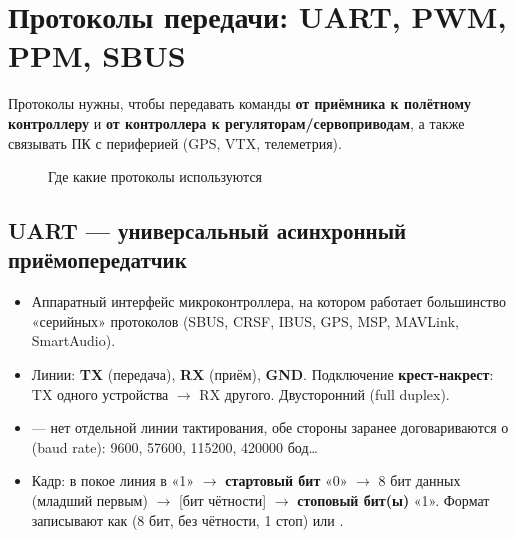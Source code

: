 \section{Протоколы передачи: UART, PWM, PPM, SBUS}

Протоколы нужны, чтобы передавать команды \textbf{от приёмника к полётному контроллеру} и \textbf{от контроллера к регуляторам/сервоприводам}, а также связывать ПК с периферией (GPS, VTX, телеметрия).

\begin{figure}[H]\centering
{}
\caption{Где какие протоколы используются}
\end{figure}

\subsection{UART — универсальный асинхронный приёмопередатчик}
\begin{itemize}
\item Аппаратный интерфейс микроконтроллера, на котором работает большинство «серийных» протоколов (SBUS, CRSF, IBUS, GPS, MSP, MAVLink, SmartAudio).
\item Линии: \textbf{TX} (передача), \textbf{RX} (приём), \textbf{GND}. Подключение \textbf{крест-накрест}: TX одного устройства $\to$ RX другого. Двусторонний (full duplex).
\item {} — нет отдельной линии тактирования, обе стороны заранее договариваются о  (baud rate): 9600, 57600, 115200, 420000 бод\ldots
\item Кадр: в покое линия в «1» $\to$ \textbf{стартовый бит} «0» $\to$ 8 бит данных (младший первым) $\to$ [бит чётности] $\to$ \textbf{стоповый бит(ы)} «1». Формат записывают как  (8 бит, без чётности, 1 стоп) или .
\end{itemize}

